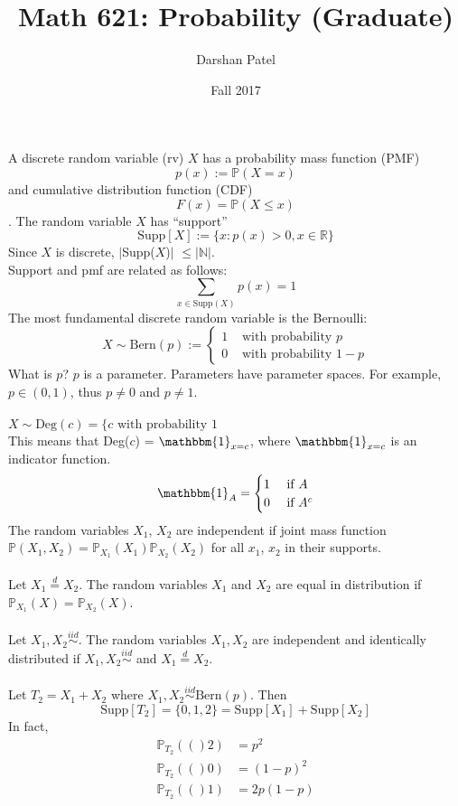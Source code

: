 \documentclass[12pt]{article}
\newcommand{\prob}[1]{\mathbb{P}(#1)}
\newcommand{\probsub}[2]{\mathbb{P}_{#1}(#2)}
\newcommand{\indicator}[1]{\mathbbm{1}_{#1}}
\begin{document}
\title{Math 621: Probability (Graduate)}
\author{Darshan Patel}
\date{Fall 2017}
\maketitle

A discrete random variable (rv) $X$ has a probability mass function (PMF) $$p(x):= \prob{X = x}$$ and cumulative distribution function (CDF) $$F(x) = \prob{X \leq x}$$. The random variable $X$ has ``support''
$$\text{Supp}[X] := \{ x : p(x) > 0, x \in \mathbb{R}\} $$ 
Since $X$ is discrete, $|$Supp($X$)$|$ $\leq |\mathbb{N}|$. \\
Support and pmf are related as follows: $$\sum_{x \in \text{Supp}(X)} p(x) = 1$$ 
The most fundamental discrete random variable is the Bernoulli: 
$$X \sim \text{Bern}(p) := \begin{cases} 1 &\text{ with probability } p \\ 
0 &\text{ with probability } 1 - p \end{cases} $$ 
What is $p$? $p$ is a parameter. Parameters have parameter spaces. For example, $p \in (0, 1)$, thus $p \neq 0$ and $p \neq 1$. \\~\\
$X \sim \text{Deg}(c) = \{ c \text{ with probability } 1 $ \\
This means that Deg($c$) = $\indicator{x = c}$, where $\indicator{x = c}$ is an indicator function. 
$$ \indicator{A} = \begin{cases} 1 &\text{ if } A \\ 0 &\text{ if } A^c \end{cases} $$ 
The random variables $X_1$, $X_2$ are independent if joint mass function $\prob{X_1, X_2} = \probsub{X_1}{X_1}\probsub{X_2}{X_2}$ for all $x_1$, $x_2$ in their supports. \\~\\
Let $X_1 \stackrel{d}{=} X_2$. The random variables $X_1$ and $X_2$ are equal in distribution if $\probsub{X_1}{X} = \probsub{X_2}{X}$. \\~\\
Let $X_1, X_2 \stackrel{iid}{\sim}$. The random variables $X_1, X_2$ are independent and identically distributed if $X_1, X_2 \stackrel{iid}{\sim}$ and $X_1 \stackrel{d}{=} X_2$. \\~\\
Let $T_2 = X_1 + X_2$ where $X_1, X_2 \stackrel{iid}{\sim} \text{Bern}(p)$. Then $$\text{Supp}[T_2] = \{0, 1, 2\} = \text{Supp}[X_1] + \text{Supp}[X_2]$$ 
In fact, $$\begin{aligned} \probsub{T_2}(2) &= p^2 \\ \probsub{T_2}(0) &= (1 - p)^2 \\ \probsub{T_2}(1) &= 2p(1 - p) \end{aligned} $$ 
\end{document}
